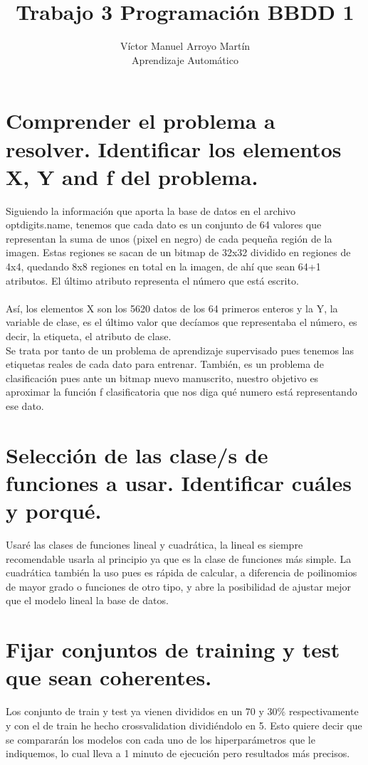 \documentclass[12pt]{article}
\date{}
\begin{document}
 
 
\title{Trabajo 3 Programación BBDD 1}
\author{Víctor Manuel Arroyo Martín\\ %
Aprendizaje Automático}

\maketitle
\section{Comprender el problema a resolver. Identificar los elementos X, Y and f del problema.}
Siguiendo la información que aporta la base de datos en el archivo optdigits.name, tenemos que cada dato es un conjunto de 64 valores que representan la suma de unos (pixel en negro) de cada pequeña región de la imagen. Estas regiones se sacan de un bitmap de 32x32 dividido en regiones de 4x4, quedando 8x8 regiones en total en la imagen, de ahí que sean 64+1 atributos. El último atributo representa el número que está escrito.\\\\
Así, los elementos X son los 5620 datos de los 64 primeros enteros y la Y, la variable de clase, es el último valor que decíamos que representaba el número, es decir, la etiqueta, el atributo de clase.\\
Se trata por tanto de un problema de aprendizaje supervisado pues tenemos las etiquetas reales de cada dato para entrenar. También, es un problema de clasificación pues ante un bitmap nuevo manuscrito, nuestro objetivo es aproximar la función f clasificatoria que nos diga qué numero está representando ese dato.
\section{Selección de las clase/s de funciones a usar. Identificar cuáles y porqué.}
Usaré las clases de funciones lineal y cuadrática, la lineal es siempre recomendable usarla al principio ya que es la clase de funciones más simple. La cuadrática también la uso pues es rápida de calcular, a diferencia de poilinomios de mayor grado o funciones de otro tipo, y abre la posibilidad de ajustar mejor que el modelo lineal la base de datos.

\section{Fijar conjuntos de training y test que sean coherentes.}
Los conjunto de train y test ya vienen divididos en un 70 y 30$\%$ respectivamente y con el de train he hecho crossvalidation dividiéndolo en 5. Esto quiere decir que se compararán los modelos con cada uno de los hiperparámetros que le indiquemos, lo cual lleva a 1 minuto de ejecución pero resultados más precisos.
\end{document}
